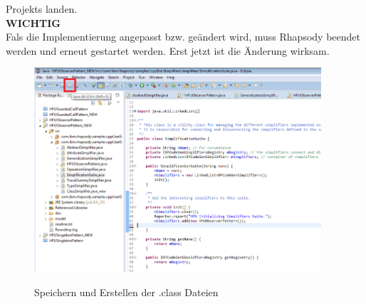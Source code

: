 Projekts landen.\\ 
\textbf{WICHTIG}\\
Fals die Implementierung angepasst bzw. geändert wird, muss
Rhapsody beendet werden und erneut gestartet werden. Erst jetzt ist die Änderung
wirksam.  
\begin{figure}[!htbp]
	\centering
	\includegraphics[width=0.95\textwidth]{content/pictures/install/saveBin.png}
	\label{pic:bild}
	\caption{Speichern und Erstellen der .class Dateien}
\end{figure}




